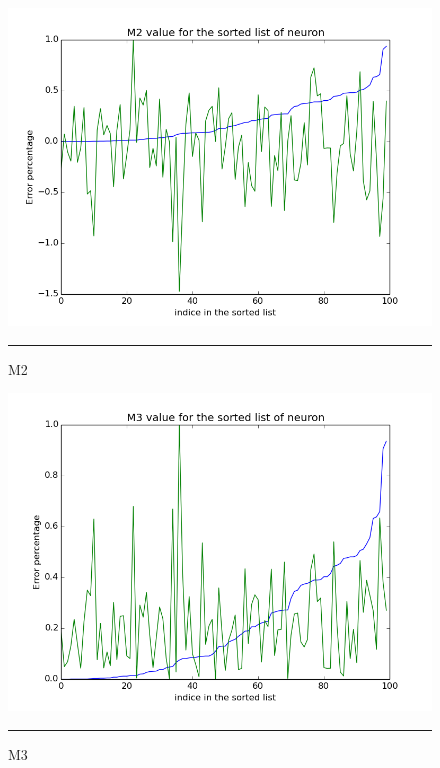 \begin{figure}[htbp]
    \centering
    \includegraphics[scale=0.5]{Figures/m2.png}
    \rule{35em}{0.5pt}
    \caption[M2]{M2}
\label{fig:m2}
\end{figure}


\begin{figure}[htbp]
    \centering
    \includegraphics[scale=0.5]{Figures/m3.png}
    \rule{35em}{0.5pt}
    \caption[M3]{M3}
    \label{fig:m3}
\end{figure}



